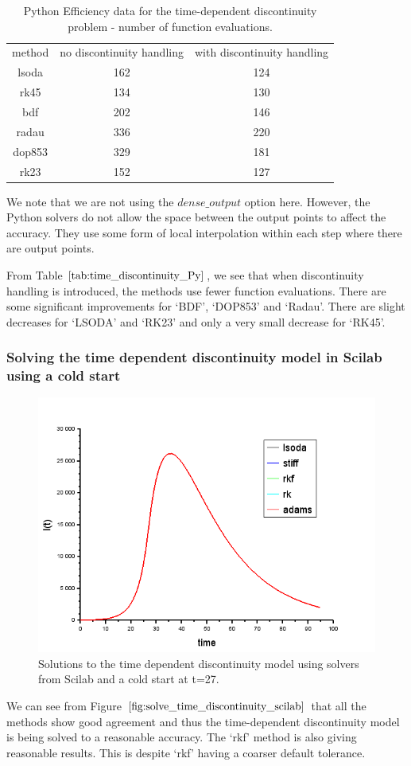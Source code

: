 \begin{table}[H]
\caption {Python Efficiency data for the time-dependent discontinuity problem - number of function evaluations.} 
\label{tab:time_discontinuity_Py} 
\begin{center}
\begin{tabular}{ c c c }
method & no discontinuity handling & with discontinuity handling \\ 
lsoda & 162 & 124 \\
rk45 & 134 & 130 \\
bdf & 202 & 146 \\
radau & 336 & 220 \\
dop853 & 329 & 181 \\
rk23 & 152 & 127 \\
\end{tabular}
\end{center}
\end{table}

We note that we are not using the $dense\_output$ option here. However, the Python solvers do not allow the space between the output points to affect the accuracy. They use some form of local interpolation within each step where there are output points.

From Table $\ref{tab:time_discontinuity_Py}$, we see that when discontinuity handling is introduced, the methods use fewer function evaluations. There are some significant improvements for `BDF', `DOP853' and `Radau'. There are slight decreases for `LSODA' and `RK23' and only a very small decrease for `RK45'.

\subsubsection{Solving the time dependent discontinuity model in Scilab using a cold start} 
\begin{figure}[H]
\centering
\includegraphics[width=0.7\linewidth]{./figures/solve_time_discontinuity_scilab}
\caption{Solutions to the time dependent discontinuity model using solvers from Scilab and a cold start at t=27.}
\label{fig:solve_time_discontinuity_scilab}
\end{figure}
We can see from Figure $\ref{fig:solve_time_discontinuity_scilab}$ that all the methods show good agreement and thus the time-dependent discontinuity model is being solved to a reasonable accuracy. The `rkf' method is also giving reasonable results. This is despite `rkf' having a coarser default tolerance.

